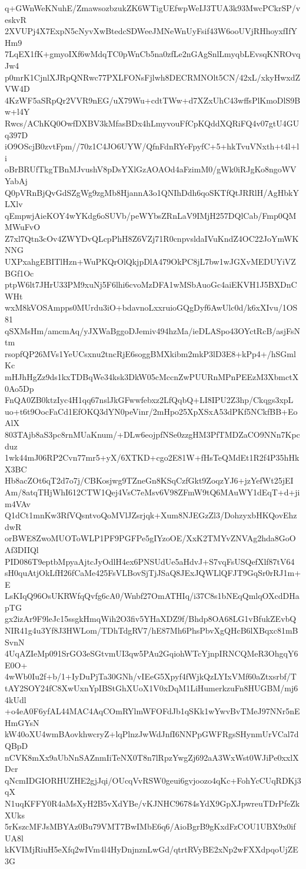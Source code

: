 q+GWnWeKNuhE/ZmawsozbzukZK6WTigUEfwpWeIJ3TUA3k93MwcPCkrSP/veskvR
2XVUPj4X7ExpN5cNyvXwBtedcSDWeeJMNeWnUyFsif43W6ooUVjRHhoyxfIfYHm9
7LqEX1fK+gmyoIXf6wMdqTC0pWnCb5na0zfLe2nGAgSnlLmyqbLEvsqKNROvqJw4
p0mrK1CjnlXJRpQNRwc77PXLFONsFjlwh8DECRMNOlt5CN/42xL/xkyHwxdZVW4D
4KzWF5aSRpQr2VVR9nEG/uX79Wu+cdtTWw+d7XZxUhC43wffsPlKmoDlS9Bw+l4Y
Rwcs/AChKQ0OwfDXBV3kMfasBDx4hLmyvouFfCpKQddXQRiFQ4v07gtU4GUq397D
iO9OScjB0zvtFpm//70z1C4JO6UYW/QfnFdnRYeFpyfC+5+hkTvuVNxth+t4l+li
oBrBRUfTkgTBnMJvushV8pDsYXlGzAOAOd4aFzimM0/gWk0iRJgKo8ngoWVYabAj
Q0pVRnBjQvGdSZgWg9zgMb8HjannA3o1QNIhDdh6qoSKTfQtJRRlH/AgHbkYLXlv
qEmpwjAieKOY4wYKdg6oSUVb/peWYbsZRnLaV9IMjH257DQlCab/Fmp0QMMWuFvO
Z7xl7Qtn3cOv4ZWYDvQLcpPhH8Z6VZj71R0cnpvsldaIVuKndZ4OC22JoYmWKNNG
UXPxahgEBITlHzn+WuPKQrOlQkjpDlA479OkPC8jL7bw1wJGXvMEDUYiVZBGf1Oc
ptpW6lt7JHrU33PM9xuNj5F6lhi6cvoMzDFA1wMSbAuoGc4aiEKVH1J5BXDnCWHt
wxM8kVOSAmpps0MUrdu3iO+bdavnoLxxruioGQgDyf6AwUlc0d/k6xXIvu/1OS81
qSXMsHm/amcmAq/yJXWaBggoDJemiv494hzMa/ieDLASpo43OYctRcB/asjFsNtm
rsopfQP26MVs1YeUCsxnu2tncRjE6soggBMXkibm2mkP3lD3E8+kPp4+/hSGmlKc
mHJhHgZz9ds1kxTDBqWe34ksk3DkW05cMccnZwPUURnMPnPEEzM3XbmctX0Ao5Dp
FnQA0ZB0ktzIyc4H1qq67nslJkGFwwfebxz2LfQqbQ+LI8IPU2Z3hp/Ckqgs3xpL
uo+t6t9OocFaCd1EfOKQ3dYN0peVinr/2mHpo25XpXSxA53dPKf5NCkfBB+EoAlX
803TAjb8aS3pc8rnMUaKnum/+DLw6eojpfNSe0zzgHM3PfTMDZaCO9NNn7Kpcduz
1wk44mJ06RP2Cvn77mr5+yX/6XTKD+cgo2E81W+fHsTeQMdEt1R2f4P35hHkX3BC
Hb8acZOt6qT2d7o7j/CBKosjwg9TZneGn8KSqCzfGkt9ZoqzYJ6+jzYefWt25jEI
Am/8atqTHjWhI612CTW1Qej4VsC7eMsv6V98ZFmW9tQ6MAuWY1dEqT+d+jim4VAv
Q1dCt1mnKw3RfVQsntvoQoMVlJZsrjqk+Xum8NJEGzZl3/DohzyxbHKQovEhzdwR
orBWE8ZwoMUOToWLP1PF9PGFPe5gIYzoOE/XxK2TMYvZNVAg2hda8GoOAf3DIIQl
PID086T9eptbMpyaAjtcJyOdlH4ex6PNSUdUe5aHdvJ+S7vqFsUSQefXlf87tV64
sH0quAtjOkLfH26fCaMe425FsVLBovSjTjJSaQ8JExJQWLlQFJT9GqSr0rRJ1m+E
LsKIqQ96OsUKRWfqQvfg6cA0/Wnbf27OmATHIq/i37C8s1bNEqQmlqOXcdDHapTG
gx2izAr9F9leJc15ssgkHmqWih2O3fiv5YHaXDZ9f/Bhdp8OA68LG1vBfukZEvbQ
NIR41g4u3Yf8J3HWLom/TDhTdgRV7/hE87Mh6PhsPbvXgQHcB6lXBqxc81mBSvnN
4UqAZIeMp091SrGO3eSGtvmUI3qw5PAu2GqiohWTcYjnpIRNCQMeR3OhgqY6E0O+
4wWb0Iu2f+b/1+IyDuPjTa30GNh/vIEeG5Xpyf4fWjkQzLYIxVMf60aZtxsrbf/T
tAY2SOY24fC8XwUxnYpIBStGhXUoX1V0xDqM1LiHumerkzuFn8HUGBM/mj64kUdl
+o4eA0F6yfAL44MAC4AqCOmRYlmWFOFdJb1qSKk1wYwvBvTMeJ97NNr5nEHmGYsN
kW40oXU4wmBAovkhwcryZ+lqPlnzJwWdJnfI6NNPpGWFRgsSHynmUrVCal7dQBpD
nCVK8mXx9aUbNnSAZnmIiTeNX0T8n7lRpzYwgZj692aA3WxWst0WJiPe0xxlXDcr
qNcmIDGIORHUZHE2gjJqi/OUcqVvRSW0geui6gvjoozo4qKc+FohYcCUqRDKj3qX
N1uqKFFY0R4aMsXyH2B5vXdYBe/vKJNHC96784sYdX9GpXJpwreuTDrPfeZkXUks
5rKszcMFJsMBYAz0Bu79VMT7BwIMbE6q6/AioBgrB9gKxdFzCOU1UBX9x0ifUA8l
kKVIMjRiuH5eXfq2wIVm4l4HyDnjnznLwGd/qtrtRVyBE2xNp2wFXXdpqoUjZE3G
